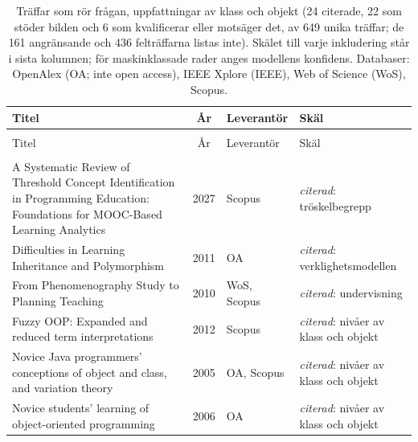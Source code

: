 
\begingroup\footnotesize
\begin{longtable}{@{}%
  >{\raggedright\arraybackslash}p{}c%
  >{\raggedright\arraybackslash}p{}%
  >{\raggedright\arraybackslash}p{}@{}}
\caption{Träffar som rör frågan, uppfattningar av klass och objekt (24 citerade, 22 som stöder bilden och 6 som kvalificerar eller motsäger det, av 649 unika träffar; de 161 angränsande och 436 felträffarna listas inte). Skälet till varje inkludering står i sista kolumnen; för maskinklassade rader anges modellens konfidens. Databaser: OpenAlex (OA; inte open access), IEEE Xplore (IEEE), Web of Science (WoS), Scopus.}\label{tab:sok-fenomenografi}\\
\toprule
Titel & År & Leverantör & Skäl \\
\midrule
\endfirsthead
\multicolumn{4}{@{}l}{\emph{\tablename~\thetable{} (forts.)}}\\
\toprule
Titel & År & Leverantör & Skäl \\
\midrule
\endhead
\midrule \multicolumn{4}{r@{}}{\emph{forts.\ på nästa sida}}\\
\endfoot
\bottomrule
\endlastfoot
A Systematic Review of Threshold Concept Identification in Programming Education: Foundations for MOOC-Based Learning Analytics & 2027 & Scopus & \emph{citerad}: tröskelbegrepp \\
Difficulties in Learning Inheritance and Polymorphism & 2011 & OA & \emph{citerad}: verklighetsmodellen \\
From Phenomenography Study to Planning Teaching & 2010 & WoS, Scopus & \emph{citerad}: undervisning \\
Fuzzy OOP: Expanded and reduced term interpretations & 2012 & Scopus & \emph{citerad}: nivåer av klass och objekt \\
Novice Java programmers' conceptions of \textquotedbl{}object\textquotedbl{} and \textquotedbl{}class\textquotedbl{}, and variation theory & 2005 & OA, Scopus & \emph{citerad}: nivåer av klass och objekt \\
Novice students' learning of object-oriented programming & 2006 & OA & \emph{citerad}: nivåer av klass och objekt \\

\end{longtable}

